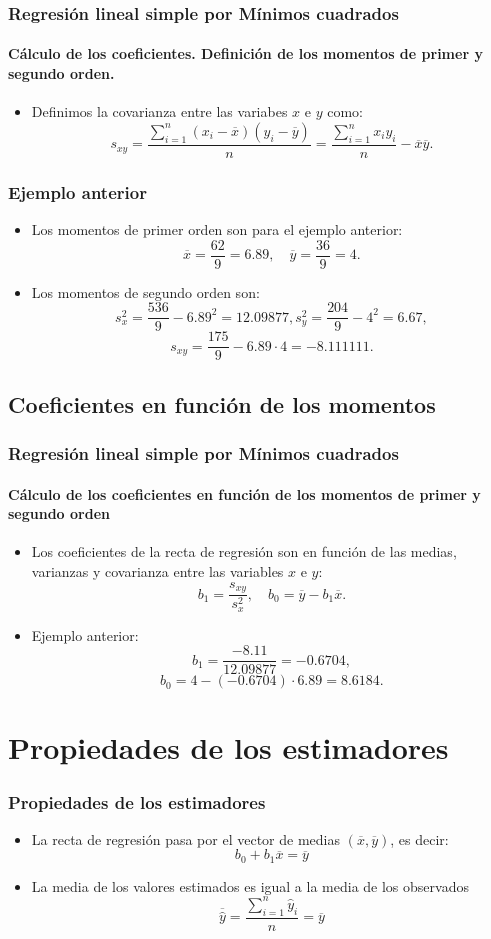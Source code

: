 \begin{frame}
\frametitle{Regresión lineal simple por Mínimos cuadrados}
\framesubtitle{Cálculo de los coeficientes. Definición de los momentos de primer y segundo orden.}
\begin{itemize}
\item<2->{Definimos la covarianza entre las variabes $x$ e $y$ como:
$$
s_{xy}=\frac{\sum\limits_{i=1}^n (x_i-\overline{x}) (y_i-\overline{y})}{n}=\frac{\sum\limits_{i=1}^n x_i y_i}{n}-\overline{x}\overline{y}.
$$}
\end{itemize}
\end{frame}

\begin{frame}
\frametitle{Ejemplo anterior}
\begin{itemize}
\item<2->{Los momentos de primer orden son para el ejemplo anterior:
$$
\overline{x}=\frac{62}{9}=6.89,\quad \overline{y}=\frac{36}{9}=4.
$$}
\item<3->{Los momentos de segundo orden son:
$$
s_x^2=\frac{536}{9}-6.89^2=12.09877, s_y^2 = \frac{204}{9}-4^2=6.67,
$$
$$
s_{xy}=\frac{175}{9}-6.89\cdot 4=-8.111111.
$$}
\end{itemize}
\end{frame}


\subsection{Coeficientes en función de los momentos}
\begin{frame}
\frametitle{Regresión lineal simple por Mínimos cuadrados}
\framesubtitle{Cálculo de los coeficientes en función de los momentos de primer y segundo orden}
\begin{itemize}
\item<2->{Los coeficientes de la recta de regresión son en función de las medias, varianzas y covarianza entre las variables $x$ e $y$:
$$
b_1 =\frac{s_{xy}}{s_x^2},\quad b_0 = \overline{y}-b_1 \overline{x}.
$$}
\item<3->{Ejemplo anterior:
$$
b_1 = \frac{-8.11}{12.09877}=-0.6704,$$
$$
b_0=4-(-0.6704)\cdot 6.89=8.6184.
$$}
\end{itemize}
\end{frame}

\section{Propiedades de los estimadores}
\begin{frame}
\frametitle{Propiedades de los estimadores}

\begin{itemize}
\item<2->{La recta de regresión pasa por el vector de medias
$(\overline{x},\overline{y})$, es decir:
$$b_0+b_1 \overline{x}=\overline{y}$$}

\item<3->{La media de los valores estimados es igual a la media de
los observados
$$\overline{\hat{y}}=\frac{\sum_{i=1}^n\hat{y}_i}
{n}=\overline{y}$$}
\end{itemize}

\end{frame}

